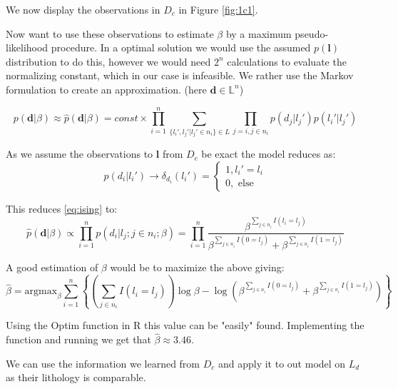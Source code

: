 \documentclass{article}
\newcommand{\vect}[1]{\ensuremath{\boldsymbol{\mathbf{#1}}}}
\begin{document}
	We now display the observations in $D_c$ in Figure \ref{fig:1c1}.
	
	Now want to use these observations to estimate $\beta$ by a maximum pseudo-likelihood procedure. In a optimal solution we would use the assumed $p(\vect l)$ distribution to do this, however we would need $2^n$ calculations to evaluate the normalizing constant, which in our case is infeasible. We rather use the Markov formulation to create an approximation.  (here $\vect d \in \mathbb{L}^n$)
	
	\begin{equation} \label{eq:ising}
		p(\vect d | \beta ) \approx \hat p(\vect d | \beta) = const \times \prod_{i = 1}^{n}\sum_{\lbrace l_i', l_j' | l_j' \in n_i \rbrace \in L }  \prod_{j = i, j \in n_i}p(d_j | l_j')p(l_i'|l_j')
	\end{equation}
	

	
	As we assume the observations to $\vect l$ from $D_c$ be exact the model reduces as:
	\begin{equation}
	p(d_i | l_i') \rightarrow \delta_{d_i}(l_i') = \begin{cases}
		1, l_i' = l_i \\ 
		0, \text{ else}
		\end{cases}
	\end{equation} 
	
	This reduces \eqref{eq:ising} to: 
	\begin{equation}
		\hat p(\vect d | \beta) \propto \prod_{i = 1}^n p(d_i|l_j; j \in n_i; \beta) = \prod_{i=1}^{n}\dfrac{\beta^{\sum_{j \in n_i}I(l_i = l_j)}}{\beta^{\sum_{j \in n_i}I(0 = l_j)} + \beta^{\sum_{j \in n_i}I(1 = l_j)}}
	\end{equation}
	
	A good estimation of $\beta$ would be to maximize the above giving:
	\begin{equation}
		\hat \beta = \text{argmax}_\beta \sum_{i=1}^{n} \left\{ \left( \sum_{j \in n_i}I(l_i = l_j)\right)\log\beta - \log\left(\beta^{\sum_{j \in n_i}I(0 = l_j)} + \beta^{\sum_{j \in n_i}I(1 = l_j)}\right) \right\}
	\end{equation}
	
	Using the Optim function in R this value can be "easily" found.  Implementing the function and running we get that $\hat \beta \approx 3.46$.
	
	We can use the information we learned from $D_c$ and apply it to out model on $L_d$ as their lithology is comparable. 
	
\end{document}
